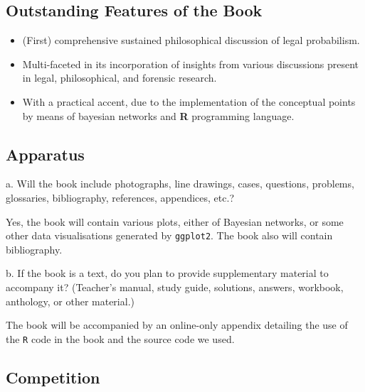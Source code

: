 \documentclass[10pt,dvipsnames,enabledeprecatedfontcommands]{scrartcl}
\begin{document}
\hypertarget{outstanding-features-of-the-book}{%
\subsection{Outstanding Features of the
Book}\label{outstanding-features-of-the-book}}

\begin{itemize}
\item
  (First) comprehensive sustained philosophical discussion of legal
  probabilism.
\item
  Multi-faceted in its incorporation of insights from various
  discussions present in legal, philosophical, and forensic research.
\item
  With a practical accent, due to the implementation of the conceptual
  points by means of bayesian networks and \textbf{\textsf{R}}
  programming language.
\end{itemize}


\hypertarget{apparatus}{%
\subsection{Apparatus}\label{apparatus}}

\footnotesize a. Will the book include photographs, line drawings,
cases, questions, problems, glossaries, bibliography, references,
appendices, etc.?

\vspace{2mm}

\normalsize

Yes, the book will contain various plots, either of Bayesian networks,
or some other data visualisations generated by \texttt{ggplot2}. The
book also will contain bibliography. \vspace{2mm}

\footnotesize b. If the book is a text, do you plan to provide
supplementary material to accompany it? (Teacher's manual, study guide,
solutions, answers, workbook, anthology, or other material.)

\vspace{2mm}

\normalsize

The book will be accompanied by an online-only appendix detailing the
use of the \texttt{R} code in the book and the source code we used.

\hypertarget{competition}{%
\subsection{Competition}\label{competition}}
\end{document}
